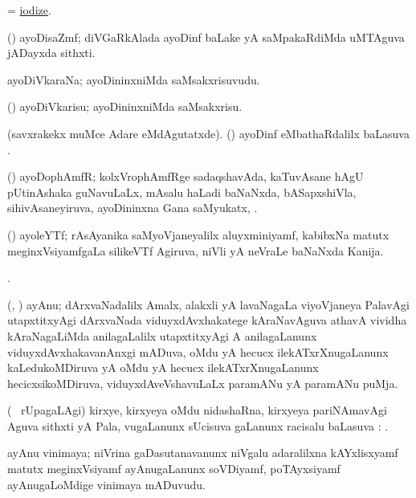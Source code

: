\bentry
{}
\gl{\sakirx}
\bmng
=  \hyperlink{iodize}{iodize}. 
\emng
\eentry

\bentry
{}
\gl{\nA}
\bmng
(\veYshA) ayoDisaZmf; diVGaRkAlada ayoDinf baLake yA saMpakaRdiMda uMTAguva jADayxda sithxti. 
\emng
\eentry

\bentry
{}
\gl{\nA}
\bmng
ayoDiVkaraNa; ayoDininxniMda saMsakxrisuvudu. 
\emng
\eentry

\bentry
{}
\gl{\sakirx}
\bmng
(\ravi) ayoDiVkarisu; ayoDininxniMda saMsakxrisu. 
\emng
\eentry

\bentry
{}
\gl{\sapUpa}
\bmng
(savxrakekx muMce Adare  eMdAgutatxde). (\ravi) ayoDinf eMbathaRdalilx baLasuva \sapUpa. 
\emng
\eentry

\bentry
{}
\gl{\nA}
\bmng
(\ravi) ayoDophAmfR; kolxVrophAmfRge sadaqshavAda, kaTuvAsane hAgU pUtinAshaka guNavuLaLx, mAsalu haLadi baNaNxda, bASapxshiVla, sihivAsaneyiruva, ayoDininxna Gana saMyukatx, . 
\emng
\eentry

\bentry
{}
\gl{\nA}
\bmng
(\Kavi) ayoleYTf; rAsAyanika saMyoVjaneyalilx aluyxminiyamf, kabibxNa matutx meginxVsiyamfgaLa silikeVTf Agiruva, niVli yA neVraLe baNaNxda Kanija. 
\emng
\eentry

\bentry
{}
\gl{\saMkiSx}
\bmng
{}. 
\emng
\eentry

\bentry
{}
\gl{\nA}
\bmng
(\ravi, \Bwvi) ayAnu; dArxvaNadalilx Amalx, alakxli yA lavaNagaLa viyoVjaneya PalavAgi utapxtitxyAgi dArxvaNada viduyxdAvxhakatege kAraNavAguva athavA vividha kAraNagaLiMda anilagaLalilx utapxtitxyAgi A anilagaLanunx viduyxdAvxhakavanAnxgi mADuva, oMdu yA hecucx ilekATxrXnugaLanunx kaLedukoMDiruva yA oMdu yA hecucx ilekATxrXnugaLanunx hecicxsikoMDiruva, viduyxdAveVshavuLaLx paramANu yA paramANu puMja. 
\emng
\eentry

\bentry
{}
\gl{\uparx}
\bmng
(\sA\  rUpagaLAgi) kirxye, kirxyeya oMdu nidashaRna, kirxyeya pariNAmavAgi Aguva sithxti yA Pala, \mo vugaLanunx sUcisuva \nA gaLanunx racisalu baLasuva \uparx: . 
\emng
\eentry

\bentry
{}
\gl{\nA}
\bmng
ayAnu vinimaya; niVrina gaDasutanavanunx niVgalu adaralilxna kAYxlisxyamf matutx meginxVsiyamf ayAnugaLanunx soVDiyamf, poTAyxsiyamf ayAnugaLoMdige vinimaya mADuvudu. 
\emng
\eentry

